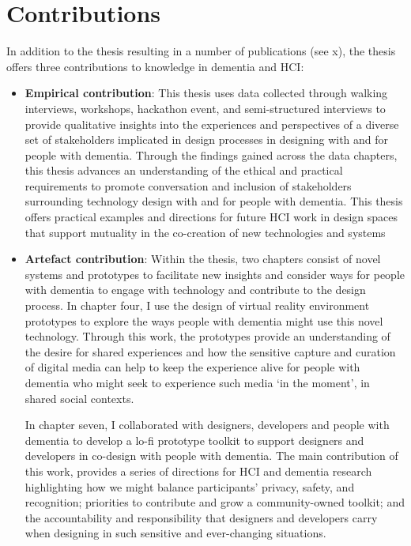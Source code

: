 \section{Contributions}
\label{Intro:Contribution}
In addition to the thesis resulting in a number of publications (see x), the thesis offers three contributions to knowledge in dementia and HCI:

\begin{itemize}
    \item \textbf{Empirical contribution}: This thesis uses data collected through walking interviews, workshops, hackathon event, and semi-structured interviews to provide qualitative insights into the experiences and perspectives of a diverse set of stakeholders implicated in design processes in designing with and for people with dementia. Through the findings gained across the data chapters, this thesis advances an understanding of the ethical and practical requirements to promote conversation and inclusion of stakeholders surrounding technology design with and for people with dementia. This thesis offers practical examples and directions for future HCI work in design spaces that support mutuality in the co-creation of new technologies and systems
    
    \item \textbf{Artefact contribution}: Within the thesis, two chapters consist of novel systems and prototypes to facilitate new insights and consider ways for people with dementia to engage with technology and contribute to the design process. In chapter four, I use the design of virtual reality environment prototypes to explore the ways people with dementia might use this novel technology. Through this work, the prototypes provide an understanding of the desire for shared experiences and how the sensitive capture and curation of digital media can help to keep the experience alive for people with dementia who might seek to experience such media `in the moment', in shared social contexts. 
    
    In chapter seven, I collaborated with designers, developers and people with dementia to develop a lo-fi prototype toolkit to support designers and developers in co-design with people with dementia. The main contribution of this work, provides a series of directions for HCI and dementia research highlighting how we might balance participants' privacy, safety, and recognition; priorities to contribute and grow a community-owned toolkit; and the accountability and responsibility that designers and developers carry when designing in such sensitive and ever-changing situations.
    

\end{itemize}
